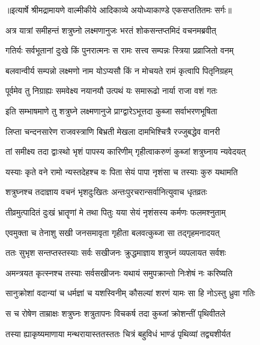 {॥इत्यार्षे श्रीमद्रामायणे वाल्मीकीये आदिकाव्ये अयोध्याकाण्डे एकसप्ततितमः सर्गः॥}


\twolineshloka
{अत्र यात्रां समीहन्तं शत्रुघ्नो लक्ष्मणानुजः}
{भरतं शोकसन्तप्तमिदं वचनमब्रवीत्} %

\twolineshloka
{गतिर्यः सर्वभूतानां दुःखे किं पुनरात्मनः}
{स रामः सत्त्व सम्पन्नः स्त्रिया प्रव्राजितो वनम्} %

\twolineshloka
{बलवान्वीर्य सम्पन्नो लक्ष्मणो नाम योऽप्यसौ}
{किं न मोचयते रामं कृत्वापि पितृनिग्रहम्} %

\twolineshloka
{पूर्वमेव तु निग्राह्यः समवेक्ष्य नयानयौ}
{उत्पथं यः समारूढो नार्या राजा वशं गतः} %

\twolineshloka
{इति सम्भाषमाणे तु शत्रुघ्ने लक्ष्मणानुजे}
{प्राग्द्वारेऽभूत्तदा कुब्जा सर्वाभरणभूषिता} %

\twolineshloka
{लिप्ता चन्दनसारेण राजवस्त्राणि बिभ्रती}
{मेखला दामभिश्चित्रै रज्जुबद्धेव वानरी} %

\twolineshloka
{तां समीक्ष्य तदा द्वाःस्थो भृशं पापस्य कारिणीम्}
{गृहीत्वाकरुणं कुब्जां शत्रुघ्नाय न्यवेदयत्} %

\twolineshloka
{यस्याः कृते वने रामो न्यस्तदेहश्च वः पिता}
{सेयं पापा नृशंसा च तस्याः कुरु यथामति} %

\twolineshloka
{शत्रुघ्नश्च तदाज्ञाय वचनं भृशदुःखितः}
{अन्तःपुरचरान्सर्वानित्युवाच धृतव्रतः} %

\twolineshloka
{तीव्रमुत्पादितं दुःखं भ्रातॄणां मे तथा पितुः}
{यया सेयं नृशंसस्य कर्मणः फलमश्नुताम्} %

\twolineshloka
{एवमुक्ता च तेनाशु सखी जनसमावृता}
{गृहीता बलवत्कुब्जा सा तद्गृहमनादयत्} %

\twolineshloka
{ततः सुभृश सन्तप्तस्तस्याः सर्वः सखीजनः}
{क्रुद्धमाज्ञाय शत्रुघ्नं व्यपलायत सर्वशः} %

\twolineshloka
{अमन्त्रयत कृत्स्नश्च तस्याः सर्वसखीजनः}
{यथायं समुपक्रान्तो निःशेषं नः करिष्यति} %

\twolineshloka
{सानुक्रोशां वदान्यां च धर्मज्ञां च यशस्विनीम्}
{कौसल्यां शरणं यामः सा हि नोऽस्तु ध्रुवा गतिः} %

\twolineshloka
{स च रोषेण ताम्राक्षः शत्रुघ्नः शत्रुतापनः}
{विचकर्ष तदा कुब्जां क्रोशन्तीं पृथिवीतले} %

\twolineshloka
{तस्या ह्याकृष्यमाणाया मन्थरायास्ततस्ततः}
{चित्रं बहुविधं भाण्डं पृथिव्यां तद्व्यशीर्यत} %

